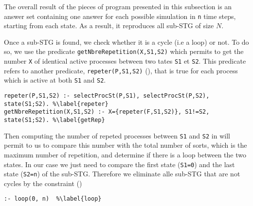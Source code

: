 The overall result of the pieces of program presented in this subsection
is an answer set containing one answer for each
possible simulation in \texttt{n} time steps,
starting from each state.
As a result, it reproduces all sub-STG of size $N$.

Once a sub-STG is found, we check whether it is a cycle (i.e a loop) or not. 
To do so, we use the predicate \texttt{getNbreRepetition(X,S1,S2)} which permits to get the number \texttt{X} of identical active processes between two tates \texttt{S1} et \texttt{S2}. This predicate refers to another predicate, \texttt{repeter(P,S1,S2)} (), that is true for each process which is active at both \texttt{S1} and \texttt{S2}. 
\begin{lstlisting}
repeter(P,S1,S2) :- selectProcSt(P,S1), selectProcSt(P,S2), state(S1;S2). %\label{repeter}
getNbreRepetition(X,S1,S2) :- X={repeter(F,S1,S2)}, S1!=S2, state(S1;S2). %\label{getRep}
\end{lstlisting}
Then computing the number of repeted processes between \texttt{S1} and \texttt{S2} in  will permit to us to compare this number with the total number of sorts, which is the maximum number of repetition, and determine if there is a loop between the two states. In our case we just need to compare the first state (\texttt{S1=0}) and the last state (\texttt{S2=n}) of the sub-STG. Therefore we eliminate alle sub-STG that are not cycles by the constraint ()
\begin{lstlisting}
:- loop(0, n)  %\label{loop}
\end{lstlisting}
